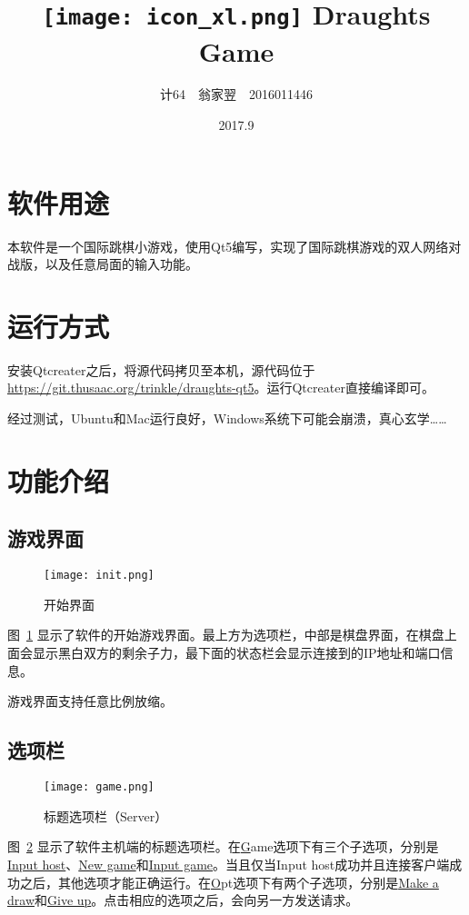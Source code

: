 \documentclass[a4paper]{article}
\title{\texttt{[image: icon\_xl.png]} \bf Draughts Game}
\date{2017.9}
\author{计64~~翁家翌~~2016011446}
\begin{document}
\kaishu
\ttfamily
\maketitle
\section{软件用途}
本软件是一个国际跳棋小游戏，使用Qt5编写，实现了国际跳棋游戏的双人网络对战版，以及任意局面的输入功能。
\section{运行方式}
安装Qtcreater之后，将源代码拷贝至本机，源代码位于\url{https://git.thusaac.org/trinkle/draughts-qt5}。运行Qtcreater直接编译即可。

经过测试，Ubuntu和Mac运行良好，Windows系统下可能会崩溃，真心玄学……
\section{功能介绍}
\subsection{游戏界面}

\begin{figure}[htp]
\centering
\texttt{[image: init.png]}
\caption{开始界面}
\label{fig:start}
\end{figure}

图~\ref{fig:start} 显示了软件的开始游戏界面。最上方为选项栏，中部是棋盘界面，在棋盘上面会显示黑白双方的剩余子力，最下面的状态栏会显示连接到的IP地址和端口信息。

游戏界面支持任意比例放缩。

\subsection{选项栏}
\begin{figure}[htp]
\centering
\texttt{[image: game.png]}
\caption{标题选项栏（Server）}
\label{fig:title}
\end{figure}

图~\ref{fig:title} 显示了软件主机端的标题选项栏。在\uline{G}ame选项下有三个子选项，分别是\uline{Input host}、\uline{New game}和\uline{Input game}。当且仅当Input host成功并且连接客户端成功之后，其他选项才能正确运行。在\uline{O}pt选项下有两个子选项，分别是\uline{Make a draw}和\uline{Give up}。点击相应的选项之后，会向另一方发送请求。
\end{document}
